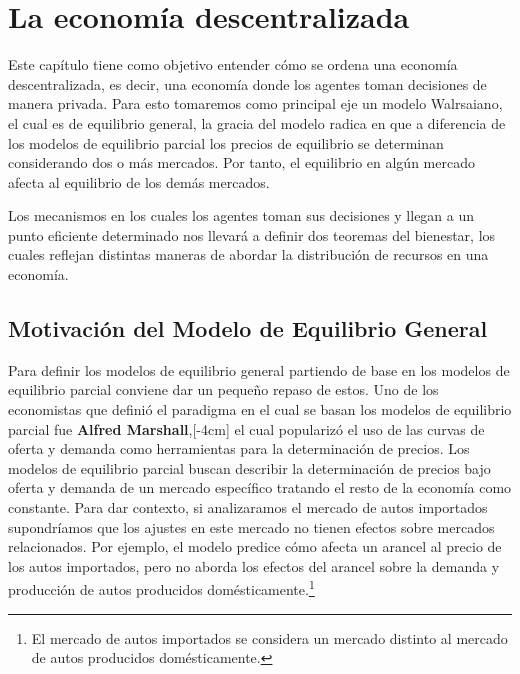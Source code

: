 \section{La economía descentralizada}

Este capítulo tiene como objetivo entender cómo se ordena una economía descentralizada, es decir, una economía donde los agentes toman decisiones de manera privada. Para esto tomaremos como principal eje un modelo Walrsaiano, el cual es de equilibrio general, la gracia del modelo radica en que a diferencia de los modelos de equilibrio parcial los precios de equilibrio se determinan considerando dos o más mercados. Por tanto, el equilibrio en algún mercado afecta al equilibrio de los demás mercados. 

Los mecanismos en los cuales los agentes toman sus decisiones y llegan a un punto eficiente determinado nos llevará a definir dos teoremas del bienestar, los cuales reflejan distintas maneras de abordar la distribución de recursos en una economía. 

\subsection{Motivación del Modelo de Equilibrio General}

Para definir los modelos de equilibrio general partiendo de base en los modelos de equilibrio parcial conviene dar un pequeño repaso de estos. Uno de los economistas que definió el paradigma en el cual se basan los modelos de equilibrio parcial fue \textbf{Alfred Marshall},[-4cm] el cual popularizó el uso de las curvas de oferta y demanda como herramientas para la determinación de precios. Los modelos de equilibrio parcial buscan describir la determinación de precios bajo oferta y demanda de un mercado específico tratando el resto de la economía como constante. Para dar contexto, si analizaramos el mercado de autos importados supondríamos que los ajustes en este mercado no tienen efectos sobre mercados relacionados. Por ejemplo, el modelo predice cómo afecta un arancel al precio de los autos importados, pero no aborda los efectos del arancel sobre la demanda y producción de autos producidos domésticamente.\footnote{El mercado de autos importados se considera un mercado distinto al mercado de autos producidos domésticamente.}

